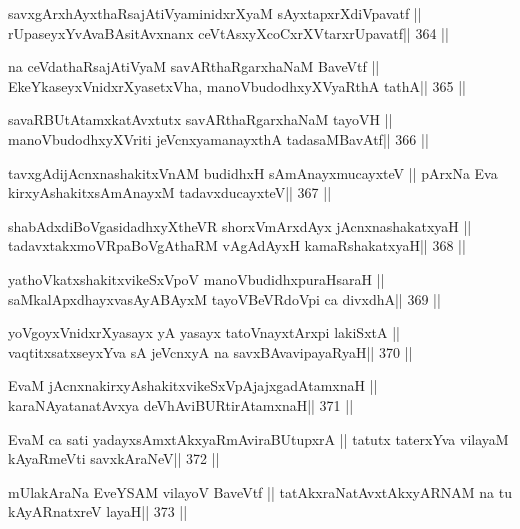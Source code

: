 \begin{shl}
savxgArxhAyxthaRsajAtiVyaminidxrXyaM sAyxtapxrXdiVpavatf ||
rUpaseyxYvAvaBAsitAvxnanx ceVtAsxyXcoCxrXVtarxrUpavatf\hfill || 364 ||
\end{shl}

\begin{shl}
na ceVdathaRsajAtiVyaM savARthaRgarxhaNaM BaveVtf ||
EkeYkaseyxVnidxrXyasetxVha, manoVbudodhxyXVyaRthA tathA\hfill || 365 ||
\end{shl}

\begin{shl}
savaRBUtAtamxkatAvxtutx savARthaRgarxhaNaM tayoVH ||
manoVbudodhxyXVriti jeVcnxyamanayxthA tadasaMBavAtf\hfill || 366 ||
\end{shl}

\begin{shl}
tavxgAdijAcnxnashakitxVnAM budidhxH sAmAnayxmucayxteV ||
pArxNa Eva kirxyAshakitxsAmAnayxM tadavxducayxteV\hfill || 367 ||
\end{shl}

\begin{shl}
shabAdxdiBoVgasidadhxyXtheVR shorxVmArxdAyx jAcnxnashakatxyaH ||
tadavxtakxmoVRpaBoVgAthaRM vAgAdAyxH kamaRshakatxyaH\hfill || 368 ||
\end{shl}

\begin{shl}
yathoVkatxshakitxvikeSxVpoV manoVbudidhxpuraHsaraH ||
saMkalApxdhayxvasAyABAyxM tayoVBeVRdoV\s pi ca divxdhA\hfill || 369 ||
\end{shl}

\begin{shl}
yoVgoyxVnidxrXyasayx yA yasayx tatoV\s nayxtArxpi lakiSxtA ||
vaqtitxsatxseyxYva sA jeVcnxyA na savxBAvavipayaRyaH\hfill || 370 ||
\end{shl}

\begin{shl}
EvaM jAcnxnakirxyAshakitxvikeSxVpAjajxgadAtamxnaH ||
karaNAyatanatAvxya deVhAviBURtirAtamxnaH\hfill || 371 ||
\end{shl}

\begin{shl}
EvaM ca sati yadayxsAmxtAkxyaRmAviraBUtupxrA ||
tatutx taterxYva vilayaM kAyaRmeVti savxkAraNeV\hfill || 372 ||
\end{shl}

\begin{shl}
mUlakAraNa EveYSAM vilayoV BaveVtf ||
tatAkxraNatAvxtAkxyARNAM na tu kAyARnatxreV layaH\hfill || 373 ||
\end{shl}

